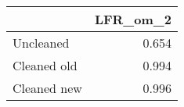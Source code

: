 \begin{tabular}{lr}
\toprule
{} & LFR_om_2 \\
\midrule
Uncleaned   &    0.654 \\
Cleaned old &    0.994 \\
Cleaned new &    0.996 \\
\bottomrule
\end{tabular}
